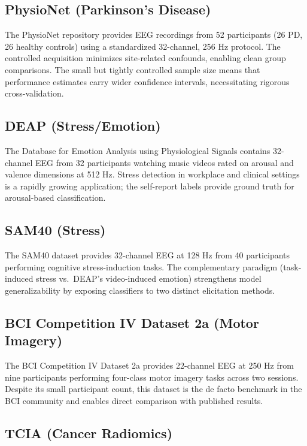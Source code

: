 \subsection{PhysioNet (Parkinson's Disease)}

The PhysioNet repository \citep{goldberger2000physionet} provides EEG recordings from 52 participants (26 PD, 26 healthy controls) using a standardized 32-channel, 256 Hz protocol. The controlled acquisition minimizes site-related confounds, enabling clean group comparisons. The small but tightly controlled sample size means that performance estimates carry wider confidence intervals, necessitating rigorous cross-validation.

\subsection{DEAP (Stress/Emotion)}

The Database for Emotion Analysis using Physiological Signals \citep{koelstra2012deap} contains 32-channel EEG from 32 participants watching music videos rated on arousal and valence dimensions at 512 Hz. Stress detection in workplace and clinical settings is a rapidly growing application; the self-report labels provide ground truth for arousal-based classification.

\subsection{SAM40 (Stress)}

The SAM40 dataset provides 32-channel EEG at 128 Hz from 40 participants performing cognitive stress-induction tasks. The complementary paradigm (task-induced stress vs.\ DEAP's video-induced emotion) strengthens model generalizability by exposing classifiers to two distinct elicitation methods.

\subsection{BCI Competition IV Dataset 2a (Motor Imagery)}

The BCI Competition IV Dataset 2a \citep{tangermann2012review} provides 22-channel EEG at 250 Hz from nine participants performing four-class motor imagery tasks across two sessions. Despite its small participant count, this dataset is the de facto benchmark in the BCI community and enables direct comparison with published results.

\subsection{TCIA (Cancer Radiomics)}


